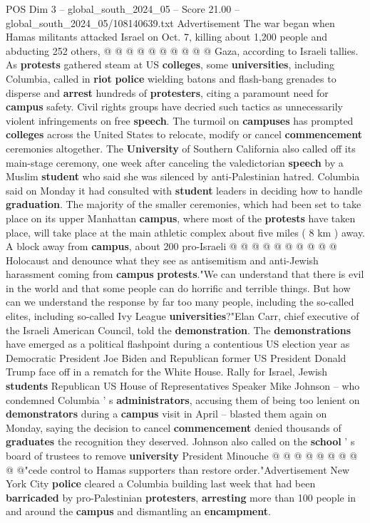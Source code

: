 \begin{textsample}{POS Dim 3 – global\_south\_2024\_05 – Score 21.00 – global\_south\_2024\_05/108140639.txt}
Advertisement The war began when Hamas militants attacked Israel on Oct. 7, killing about 1,200 people and abducting 252 others, @ @ @ @ @ @ @ @ @ @ Gaza, according to Israeli tallies.
As \textbf{protests} gathered steam at US \textbf{colleges}, some \textbf{universities}, including Columbia, called in \textbf{riot} \textbf{police} wielding batons and flash-bang grenades to disperse and \textbf{arrest} hundreds of \textbf{protesters}, citing a paramount need for \textbf{campus} safety.
Civil rights groups have decried such tactics as unnecessarily violent infringements on free \textbf{speech}.
The turmoil on \textbf{campuses} has prompted \textbf{colleges} across the United States to relocate, modify or cancel \textbf{commencement} ceremonies altogether.
The \textbf{University} of Southern California also called off its main-stage ceremony, one week after canceling the valedictorian \textbf{speech} by a Muslim \textbf{student} who said she was silenced by anti-Palestinian hatred.
Columbia said on Monday it had consulted with \textbf{student} leaders in deciding how to handle \textbf{graduation}.
The majority of the smaller ceremonies, which had been set to take place on its upper Manhattan \textbf{campus}, where most of the \textbf{protests} have taken place, will take place at the main athletic complex about five miles ( 8 km ) away.
A block away from \textbf{campus}, about 200 pro-Israeli @ @ @ @ @ @ @ @ @ @ Holocaust and denounce what they see as antisemitism and anti-Jewish harassment coming from \textbf{campus} \textbf{protests}."We can understand that there is evil in the world and that some people can do horrific and terrible things.
But how can we understand the response by far too many people, including the so-called elites, including so-called Ivy League \textbf{universities}?"Elan Carr, chief executive of the Israeli American Council, told the \textbf{demonstration}.
The \textbf{demonstrations} have emerged as a political flashpoint during a contentious US election year as Democratic President Joe Biden and Republican former US President Donald Trump face off in a rematch for the White House.
Rally for Israel, Jewish \textbf{students} Republican US House of Representatives Speaker Mike Johnson -- who condemned Columbia ' s \textbf{administrators}, accusing them of being too lenient on \textbf{demonstrators} during a \textbf{campus} visit in April -- blasted them again on Monday, saying the decision to cancel \textbf{commencement} denied thousands of \textbf{graduates} the recognition they deserved.
Johnson also called on the \textbf{school} ' s board of trustees to remove \textbf{university} President Minouche @ @ @ @ @ @ @ @ @ @"cede control to Hamas supporters than restore order."Advertisement New York City \textbf{police} cleared a Columbia building last week that had been \textbf{barricaded} by pro-Palestinian \textbf{protesters}, \textbf{arresting} more than 100 people in and around the \textbf{campus} and dismantling an \textbf{encampment}.

\end{textsample}
